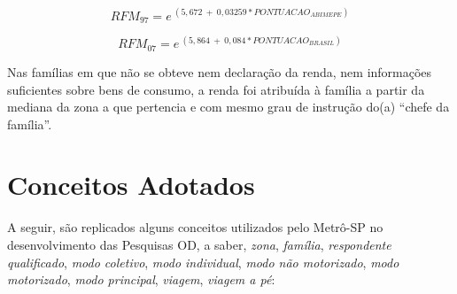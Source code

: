 \begin{equation}\label{eq:reg-renda-97}
RFM_{97} = e^{~(5,672~+~0,03259*PONTUACAO_{ABIMEPE})}
\end{equation}

\begin{equation}\label{eq:reg-renda-07}
RFM_{07} = e^{~(5,864~+~0,084*PONTUACAO_{BRASIL})}
\end{equation}

Nas famílias em que não se obteve nem declaração da renda, nem informações suficientes sobre bens de consumo, a renda foi atribuída à família a partir da mediana da zona a que pertencia e com mesmo grau de instrução do(a) ``chefe da família''.

\newpage
\section{Conceitos Adotados}\label{sec:conceitos}

A seguir, são replicados alguns conceitos utilizados pelo Metrô-SP no desenvolvimento das Pesquisas OD, a saber, \emph{zona}, \emph{família}, \emph{respondente qualificado}, \emph{modo coletivo}, \emph{modo individual}, \emph{modo não motorizado}, \emph{modo motorizado}, \emph{modo principal}, \emph{viagem}, \emph{viagem a pé}: 


